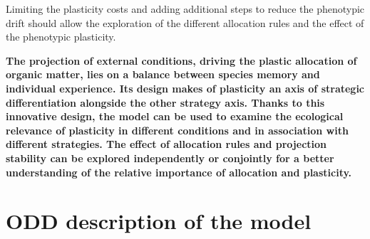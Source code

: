 Limiting the plasticity costs and adding additional steps to reduce the phenotypic drift should allow the exploration of the different allocation rules and the effect of the phenotypic plasticity.
%
%
%
%
%
%

 
 
\textbf{The projection of external conditions, driving the plastic allocation of organic matter, lies on a balance between species memory and individual experience. Its design makes of plasticity an axis of strategic differentiation alongside the other strategy axis. Thanks to this innovative design, the model can be used to examine the ecological relevance of plasticity in different conditions and in association with different strategies. The effect of allocation rules and projection stability can be explored independently or conjointly for a better understanding of the relative importance of allocation and plasticity.}




\chapter{ODD description of the model \model}\label{chapter:model-description}

